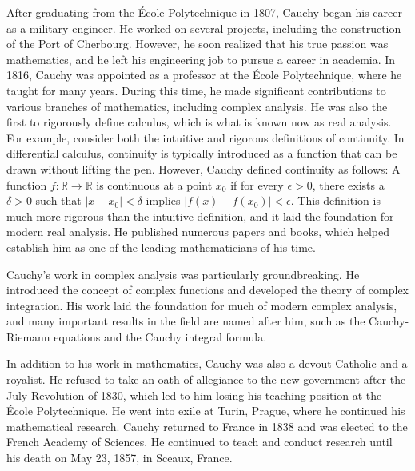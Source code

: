 \documentclass[12pt,letterpaper]{article}
\begin{document}
After graduating from the École Polytechnique in 1807, Cauchy began his career as a military engineer. 
He worked on several projects, including the construction of the Port of Cherbourg. 
However, he soon realized that his true passion was mathematics, and he left his engineering job to pursue a career in academia.
In 1816, Cauchy was appointed as a professor at the École Polytechnique, where he taught for many years. 
During this time, he made significant contributions to various branches of mathematics, including complex analysis.
He was also the first to rigorously define calculus, which is what is known now as real analysis.
For example, consider both the intuitive and rigorous definitions of continuity.
In differential calculus, continuity is typically introduced as a function that can be drawn without lifting the pen.
However, Cauchy defined continuity as follows:
A function $f: \mathbb{R} \to \mathbb{R}$ is continuous at a point $x_0$ if for every $\epsilon > 0$, there exists a $\delta > 0$ such that $|x - x_0| < \delta$ implies $|f(x) - f(x_0)| < \epsilon$.
This definition is much more rigorous than the intuitive definition, and it laid the foundation for modern real analysis.
He published numerous papers and books, which helped establish him as one of the leading mathematicians of his time.

Cauchy's work in complex analysis was particularly groundbreaking.
He introduced the concept of complex functions and developed the theory of complex integration. 
His work laid the foundation for much of modern complex analysis, and many important results in the field are named after him, such as the Cauchy-Riemann equations and the Cauchy integral formula.

In addition to his work in mathematics, Cauchy was also a devout Catholic and a royalist. 
He refused to take an oath of allegiance to the new government after the July Revolution of 1830, which led to him losing his teaching position at the École Polytechnique. 
He went into exile at Turin, Prague, where he continued his mathematical research.
Cauchy returned to France in 1838 and was elected to the French Academy of Sciences. 
He continued to teach and conduct research until his death on May 23, 1857, in Sceaux, France.
\end{document}
